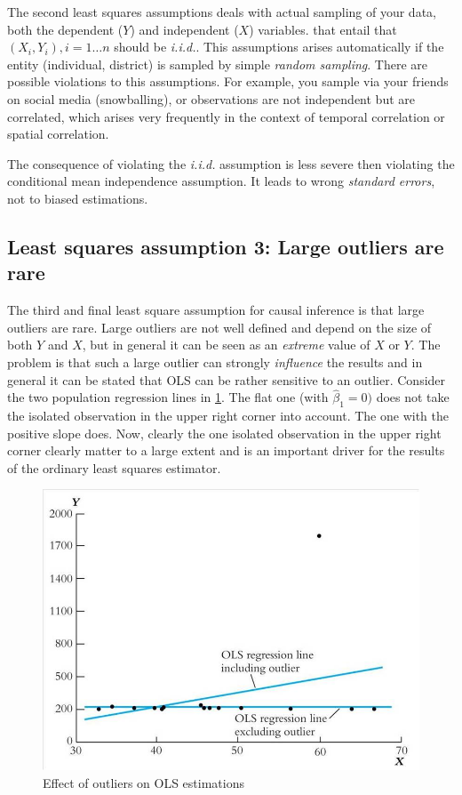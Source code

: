 \documentclass[
]{book}
\begin{document}
The second least squares assumptions deals with actual sampling of your data, both the dependent (\(Y\)) and independent (\(X\)) variables. that entail that \((X_i,Y_i), i = 1 \dots n\) should be \emph{i.i.d.}. This assumptions arises automatically if the entity (individual, district) is sampled by simple \emph{random sampling}. There are possible violations to this assumptions. For example, you sample via your friends on social media (snowballing), or observations are not independent but are correlated, which arises very frequently in the context of temporal correlation or spatial correlation.

The consequence of violating the \emph{i.i.d.} assumption is less severe then violating the conditional mean independence assumption. It leads to wrong \emph{standard errors}, not to biased estimations.

\hypertarget{least-squares-assumption-3-large-outliers-are-rare}{%
\subsection{Least squares assumption 3: Large outliers are rare}\label{least-squares-assumption-3-large-outliers-are-rare}}

The third and final least square assumption for causal inference is that large outliers are rare. Large outliers are not well defined and depend on the size of both \(Y\) and \(X\), but in general it can be seen as an \emph{extreme} value of \(X\) or \(Y\). The problem is that such a large outlier can strongly \emph{influence} the results and in general it can be stated that OLS can be rather sensitive to an outlier. Consider the two population regression lines in \ref{fig:outlier}. The flat one (with \(\hat{\beta}_1 = 0)\) does not take the isolated observation in the upper right corner into account. The one with the positive slope does. Now, clearly the one isolated observation in the upper right corner clearly matter to a large extent and is an important driver for the results of the ordinary least squares estimator.

\begin{figure}
\centering
\includegraphics{./figures/Lecture1_sheet29.jpg}
\caption{\label{fig:outlier}Effect of outliers on OLS estimations}
\end{figure}
\end{document}
